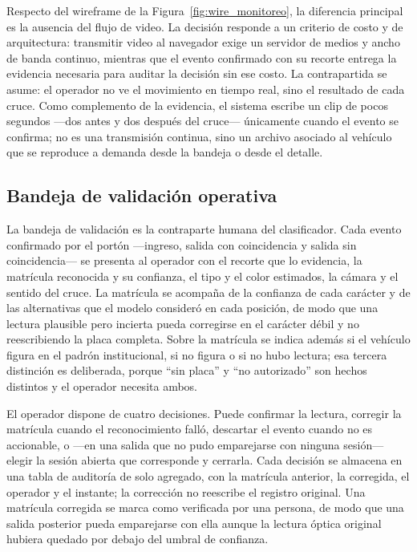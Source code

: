 Respecto del wireframe de la Figura~\ref{fig:wire_monitoreo}, la diferencia
principal es la ausencia del flujo de video. La decisión responde a un criterio de
costo y de arquitectura: transmitir video al navegador exige un servidor de
medios y ancho de banda continuo, mientras que el evento confirmado con su
recorte entrega la evidencia necesaria para auditar la decisión sin ese costo. La
contrapartida se asume: el operador no ve el movimiento en tiempo real, sino el
resultado de cada cruce. Como complemento de la evidencia, el sistema escribe un
clip de pocos segundos ---dos antes y dos después del cruce--- únicamente cuando
el evento se confirma; no es una transmisión continua, sino un archivo asociado al
vehículo que se reproduce a demanda desde la bandeja o desde el detalle.

\subsection{Bandeja de validación operativa}

La bandeja de validación es la contraparte humana del clasificador. Cada evento
confirmado por el portón ---ingreso, salida con coincidencia y salida sin
coincidencia--- se presenta al operador con el recorte que lo evidencia, la
matrícula reconocida y su confianza, el tipo y el color estimados, la cámara y el
sentido del cruce. La matrícula se acompaña de la confianza de cada carácter y de
las alternativas que el modelo consideró en cada posición, de modo que una lectura
plausible pero incierta pueda corregirse en el carácter débil y no reescribiendo
la placa completa. Sobre la matrícula se indica además si el vehículo figura en el
padrón institucional, si no figura o si no hubo lectura; esa tercera distinción es
deliberada, porque ``sin placa'' y ``no autorizado'' son hechos distintos y el
operador necesita ambos.

El operador dispone de cuatro decisiones. Puede confirmar la lectura, corregir la
matrícula cuando el reconocimiento falló, descartar el evento cuando no es
accionable, o ---en una salida que no pudo emparejarse con ninguna sesión--- elegir
la sesión abierta que corresponde y cerrarla. Cada decisión se almacena en una
tabla de auditoría de solo agregado, con la matrícula anterior, la corregida, el
operador y el instante; la corrección no reescribe el registro original. Una
matrícula corregida se marca como verificada por una persona, de modo que una
salida posterior pueda emparejarse con ella aunque la lectura óptica original
hubiera quedado por debajo del umbral de confianza.

